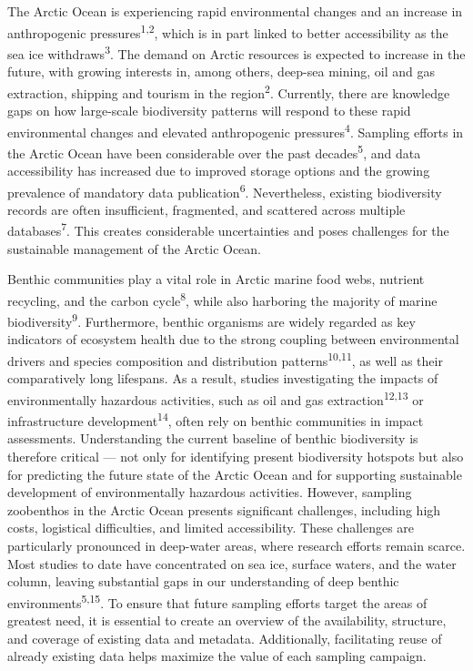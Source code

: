 \documentclass[
  letterpaper,
  DIV=11,
  numbers=noendperiod]{scrartcl}
\begin{document}
The Arctic Ocean is experiencing rapid environmental changes and an
increase in anthropogenic pressures\textsuperscript{1,2}, which is in
part linked to better accessibility as the sea ice
withdraws\textsuperscript{3}. The demand on Arctic resources is expected
to increase in the future, with growing interests in, among others,
deep-sea mining, oil and gas extraction, shipping and tourism in the
region\textsuperscript{2}. Currently, there are knowledge gaps on how
large-scale biodiversity patterns will respond to these rapid
environmental changes and elevated anthropogenic
pressures\textsuperscript{4}. Sampling efforts in the Arctic Ocean have
been considerable over the past decades\textsuperscript{5}, and data
accessibility has increased due to improved storage options and the
growing prevalence of mandatory data publication\textsuperscript{6}.
Nevertheless, existing biodiversity records are often insufficient,
fragmented, and scattered across multiple databases\textsuperscript{7}.
This creates considerable uncertainties and poses challenges for the
sustainable management of the Arctic Ocean.

Benthic communities play a vital role in Arctic marine food webs,
nutrient recycling, and the carbon cycle\textsuperscript{8}, while also
harboring the majority of marine biodiversity\textsuperscript{9}.
Furthermore, benthic organisms are widely regarded as key indicators of
ecosystem health due to the strong coupling between environmental
drivers and species composition and distribution
patterns\textsuperscript{10,11}, as well as their comparatively long
lifespans. As a result, studies investigating the impacts of
environmentally hazardous activities, such as oil and gas
extraction\textsuperscript{12,13} or infrastructure
development\textsuperscript{14}, often rely on benthic communities in
impact assessments. Understanding the current baseline of benthic
biodiversity is therefore critical --- not only for identifying present
biodiversity hotspots but also for predicting the future state of the
Arctic Ocean and for supporting sustainable development of
environmentally hazardous activities. However, sampling zoobenthos in
the Arctic Ocean presents significant challenges, including high costs,
logistical difficulties, and limited accessibility. These challenges are
particularly pronounced in deep-water areas, where research efforts
remain scarce. Most studies to date have concentrated on sea ice,
surface waters, and the water column, leaving substantial gaps in our
understanding of deep benthic environments\textsuperscript{5,15}. To
ensure that future sampling efforts target the areas of greatest need,
it is essential to create an overview of the availability, structure,
and coverage of existing data and metadata. Additionally, facilitating
reuse of already existing data helps maximize the value of each sampling
campaign.
\end{document}
